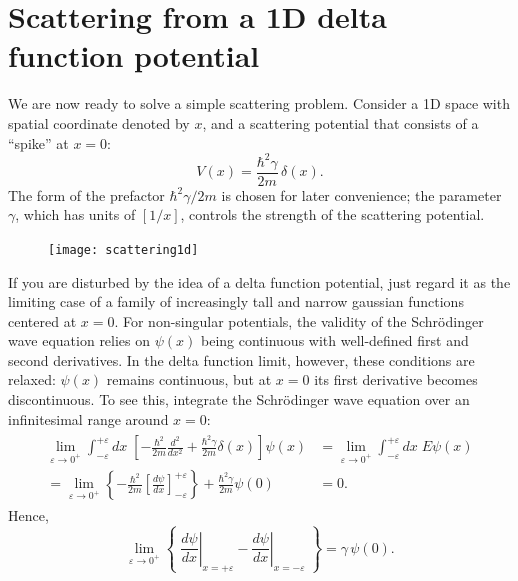 \documentclass[pra,12pt]{revtex4}
\begin{document}
\section{Scattering from a 1D delta function potential}
\label{sec:1dscatter}

We are now ready to solve a simple scattering problem.  Consider a 1D
space with spatial coordinate denoted by $x$, and a scattering
potential that consists of a ``spike'' at $x = 0$:
\begin{equation}
  V(x) = \frac{\hbar^2\gamma}{2m} \,\delta(x).
\end{equation}
The form of the prefactor $\hbar^2\gamma/2m$ is chosen for later
convenience; the parameter $\gamma$, which has units of $[1/x]$,
controls the strength of the scattering potential.

\begin{figure}[h]
  \centering\texttt{[image: scattering1d]}
\end{figure}

If you are disturbed by the idea of a delta function potential, just
regard it as the limiting case of a family of increasingly tall and
narrow gaussian functions centered at $x=0$.  For non-singular
potentials, the validity of the Schr\"odinger wave equation relies on
$\psi(x)$ being continuous with well-defined first and second
derivatives.  In the delta function limit, however, these conditions
are relaxed: $\psi(x)$ remains continuous, but at $x=0$ its first
derivative becomes discontinuous.  To see this, integrate the
Schr\"odinger wave equation over an infinitesimal range around $x =
0$:
\begin{align}
  \begin{aligned}\lim_{\varepsilon\rightarrow 0^+} \int_{-\varepsilon}^{+\varepsilon} dx\; \left[-\frac{\hbar^2}{2m} \frac{d^2}{dx^2} + \frac{\hbar^2\gamma}{2m} \delta(x)\right] \psi(x) &= \lim_{\varepsilon\rightarrow 0^+} \int_{-\varepsilon}^{+\varepsilon} dx\; E \psi(x) \\ = \lim_{\varepsilon\rightarrow 0^+} \left\{-\frac{\hbar^2}{2m} \left[\frac{d\psi}{dx}\right]_{-\varepsilon}^{+\varepsilon} \right\} + \frac{\hbar^2\gamma}{2m} \psi(0) &= 0.
  \end{aligned}
\end{align}
Hence,
\begin{equation}
  \lim_{\varepsilon\rightarrow 0^+} \left\{\; \left.\frac{d\psi}{dx}\right|_{x = +\varepsilon} - \left.\frac{d\psi}{dx}\right|_{x = -\varepsilon}\; \right\} =  \gamma \,\psi(0).
  \label{delta_discontinuity}
\end{equation}
\end{document}
